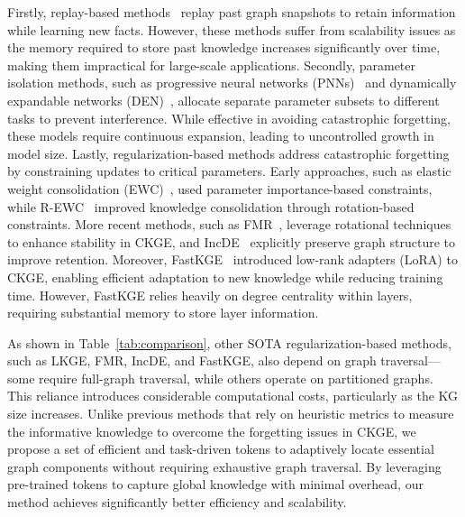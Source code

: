 \documentclass[runningheads]{llncs}
\begin{document}
Firstly, replay-based methods~\cite{lopez2017gradient,zhou2021overcoming} replay past graph snapshots to retain information while learning new facts. However, these methods suffer from scalability issues as the memory required to store past knowledge increases significantly over time, making them impractical for large-scale applications. Secondly, parameter isolation methods, such as progressive neural networks (PNNs)~\cite{rusu2016progressive} and dynamically expandable networks (DEN)~\cite{yoon2017lifelong}, allocate separate parameter subsets to different tasks to prevent interference. While effective in avoiding catastrophic forgetting, these models require continuous expansion, leading to uncontrolled growth in model size. Lastly, regularization-based methods address catastrophic forgetting by constraining updates to critical parameters. Early approaches, such as elastic weight consolidation (EWC)~\cite{kirkpatrick2017overcoming}, used parameter importance-based constraints, while R-EWC~\cite{liu2018rotate} improved knowledge consolidation through rotation-based constraints. More recent methods, such as FMR~\cite{10825244}, leverage rotational techniques to enhance stability in CKGE, and IncDE~\cite{liu2024towards} explicitly preserve graph structure to improve retention. Moreover, FastKGE~\cite{liu2024fast} introduced low-rank adapters (LoRA) to CKGE, enabling efficient adaptation to new knowledge while reducing training time. However, FastKGE relies heavily on degree centrality within layers, requiring substantial memory to store layer information. 

As shown in Table~\ref{tab:comparison}, other SOTA regularization-based methods, such as LKGE, FMR, IncDE, and FastKGE, also depend on graph traversal—some require full-graph traversal, while others operate on partitioned graphs. This reliance introduces considerable computational costs, particularly as the KG size increases. Unlike previous methods that rely on heuristic metrics to measure the informative knowledge to overcome the forgetting issues in CKGE, we propose a set of efficient and task-driven tokens to adaptively locate essential graph components without requiring exhaustive graph traversal. By leveraging pre-trained tokens to capture global knowledge with minimal overhead, our method achieves significantly better efficiency and scalability. 


\end{document}

